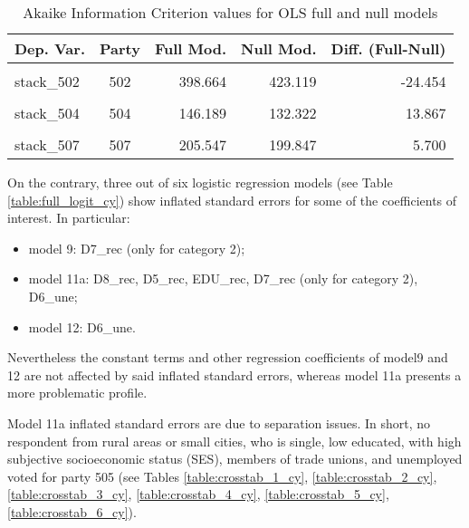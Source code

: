 \documentclass[
]{article}
\providecommand{\tightlist}{%
  \setlength{\itemsep}{0pt}\setlength{\parskip}{0pt}}
\begin{document}
\begin{table}[!h]

\caption{\label{tab:unnamed-chunk-40}Akaike Information Criterion values for OLS full and null models 
        \label{table:ols_aic_cy}}
\centering
\begin{tabular}[t]{lcrrr}
\toprule
Dep. Var. & Party & Full Mod. & Null Mod. & Diff. (Full-Null)\\
\midrule
\cellcolor{gray!6}{stack\_501} & \cellcolor{gray!6}{501} & \cellcolor{gray!6}{343.229} & \cellcolor{gray!6}{362.833} & \cellcolor{gray!6}{-19.603}\\
stack\_502 & 502 & 398.664 & 423.119 & -24.454\\
\cellcolor{gray!6}{stack\_503} & \cellcolor{gray!6}{503} & \cellcolor{gray!6}{263.353} & \cellcolor{gray!6}{256.408} & \cellcolor{gray!6}{6.945}\\
stack\_504 & 504 & 146.189 & 132.322 & 13.867\\
\cellcolor{gray!6}{stack\_505} & \cellcolor{gray!6}{505} & \cellcolor{gray!6}{114.659} & \cellcolor{gray!6}{107.763} & \cellcolor{gray!6}{6.896}\\
\addlinespace
stack\_507 & 507 & 205.547 & 199.847 & 5.700\\
\bottomrule
\end{tabular}
\end{table}

On the contrary, three out of six logistic regression models (see Table \ref{table:full_logit_cy}) show
inflated standard errors for some of the coefficients of interest. In particular:

\begin{itemize}
\tightlist
\item
  model 9: D7\_rec (only for category 2);
\item
  model 11a: D8\_rec, D5\_rec, EDU\_rec, D7\_rec (only for category 2), D6\_une;
\item
  model 12: D6\_une.
\end{itemize}

Nevertheless the constant terms and other regression coefficients of model9 and 12 are not affected by said inflated standard errors, whereas model 11a presents a more problematic profile.

Model 11a inflated standard errors are due to separation issues. In short, no respondent from rural areas
or small cities, who is single, low educated, with high subjective socioeconomic status (SES), members of trade unions, and unemployed voted for party 505 (see Tables \ref{table:crosstab_1_cy},
\ref{table:crosstab_2_cy}, \ref{table:crosstab_3_cy}, \ref{table:crosstab_4_cy},
\ref{table:crosstab_5_cy}, \ref{table:crosstab_6_cy}).
\end{document}
